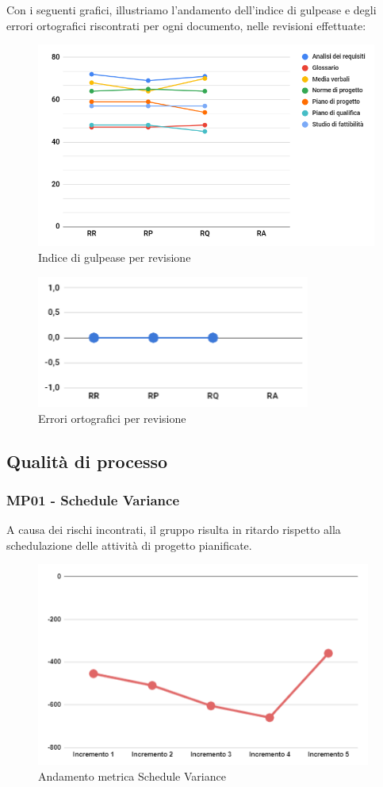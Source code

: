 \noindent Con i seguenti grafici, illustriamo l'andamento dell'indice di gulpease e degli errori ortografici riscontrati per ogni documento, nelle revisioni effettuate:
\begin{figure}[H]
	\centering
	\includegraphics[width=12cm]{images/gulpease.png}
	\caption{Indice di gulpease per revisione}
\end{figure}
\begin{figure}[H]
	\centering
	\includegraphics[width=9cm]{images/err_ortografici.png}
	\caption{Errori ortografici per revisione}
\end{figure}

\subsection{Qualità di processo}

\subsubsection{MP01 - Schedule Variance}
A causa dei rischi incontrati, il gruppo risulta in ritardo rispetto alla schedulazione delle attività di progetto pianificate.
\begin{figure}[H]
	\centering
	\includegraphics[width=11cm]{images/schedule_variance.png}
	\caption{Andamento metrica Schedule Variance}
\end{figure}

